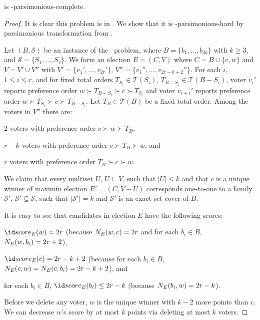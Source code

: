\begin{theorem} \label{th:mmdvc}
	 is \sharpPclass-parsimonious-complete.
\end{theorem}

\begin{proof}
It is clear this problem is in \sharpPclass.
We show that it is \sharpPclass-parsimonious-hard by parsimonious transformation from \sharpXthreeC.

Let $(B,\mathcal{S})$ be an instance of the \sharpXthreeC\ problem, where $B=\{b_1,\dots,b_{3k}\}$ with $k\ge3$, and $\mathcal{S}=\{S_1,\dots,S_r\}$.
We form an election $E=(C,V)$ where $C=B\cup\{c,w\}$ and $V=V'\cup V''$ with $V'=\{v_1',\dots,v_{2r}'\}$, $V''=\{v_1'',\dots,v_{2r-k+2}''\}$.
For each $i$, $1\le i\le r$, and for fixed total orders $T_{S_i}\in\mathcal{T}(S_i)$, $T_{B-S_i}\in\mathcal{T}(B-S_i)$, voter $v_i'$ reports preference order $w\succ T_{B-S_i}\succ c\succ T_{S_i}$ and voter $v_{r+i}'$ reports preference order $w\succ\overleftarrow{T_{S_i}}\succ c\succ\overleftarrow{T_{B-S_i}}$.
Let $T_B\in\mathcal{T}(B)$ be a fixed total order.
Among the voters in $V''$ there are:
\begin{Enumerate}
	\item 2 voters with preference order $c\succ w\succ T_B$,
	\item $r-k$ voters with preference order $c\succ T_B\succ w$, and
	\item $r$ voters with preference order $T_B\succ c\succ w$.
\end{Enumerate}

We claim that every multiset $U$, $U\subseteq V$, such that $|U|\le k$ and that $c$ is a unique winner of maximin election $E'=(C,V-U)$ corresponds one-to-one to a family $\mathcal{S'}$, $\mathcal{S'}\subseteq\mathcal{S}$, such that $|\mathcal{S'}|=k$ and $\mathcal{S'}$ is an exact set cover of $B$.

It is easy to see that candidates in election $E$ have the following scores:
\begin{Enumerate}
	\item $\score{E}(w)=2r$ (because $N_{E}(w,c)=2r$ and for each $b_i\in B$, $N_{E}(w,b_i)=2r+2$),
	\item $\score{E}(c)=2r-k+2$ (because for each $b_i\in B$, $N_{E}(c,w)=N_{E}(c,b_i)=2r-k+2$), and
	\item for each $b_i\in B$, $\score{E}(b_i)\le2r-k$ (because $N_{E}(b_i,w)=2r-k$).
\end{Enumerate}
Before we delete any voter, $w$ is the unique winner with $k-2$ more points than $c$.
We can decrease $w$'s score by at most $k$ points via deleting at most $k$ voters.


\end{proof}
